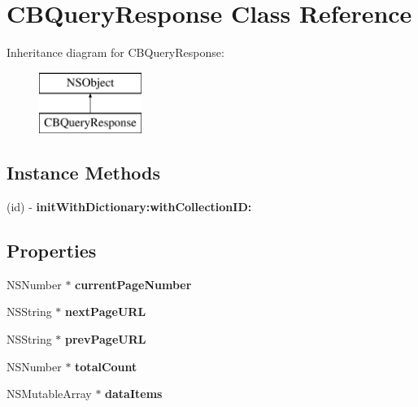 \hypertarget{interface_c_b_query_response}{\section{C\+B\+Query\+Response Class Reference}
\label{interface_c_b_query_response}
}
Inheritance diagram for C\+B\+Query\+Response\+:\begin{figure}[H]
\begin{center}
\leavevmode
\includegraphics[height=2.000000cm]{interface_c_b_query_response}
\end{center}
\end{figure}
\subsection*{Instance Methods}
\begin{DoxyCompactItemize}
\item 
\hypertarget{interface_c_b_query_response_a809ad4e5c9b92f804f0129ce1e0b9088}{(id) -\/ {\bfseries init\+With\+Dictionary\+:with\+Collection\+I\+D\+:}}\label{interface_c_b_query_response_a809ad4e5c9b92f804f0129ce1e0b9088}

\end{DoxyCompactItemize}
\subsection*{Properties}
\begin{DoxyCompactItemize}
\item 
\hypertarget{interface_c_b_query_response_aba01b6c192068322b0fa67e97156d305}{N\+S\+Number $\ast$ {\bfseries current\+Page\+Number}}\label{interface_c_b_query_response_aba01b6c192068322b0fa67e97156d305}

\item 
\hypertarget{interface_c_b_query_response_aef008d794504b80df0fc3ed352f09a87}{N\+S\+String $\ast$ {\bfseries next\+Page\+U\+R\+L}}\label{interface_c_b_query_response_aef008d794504b80df0fc3ed352f09a87}

\item 
\hypertarget{interface_c_b_query_response_af98ac11e259c7081eb542478759d1058}{N\+S\+String $\ast$ {\bfseries prev\+Page\+U\+R\+L}}\label{interface_c_b_query_response_af98ac11e259c7081eb542478759d1058}

\item 
\hypertarget{interface_c_b_query_response_a99789266e0e1a9d84d7a7369af0234db}{N\+S\+Number $\ast$ {\bfseries total\+Count}}\label{interface_c_b_query_response_a99789266e0e1a9d84d7a7369af0234db}

\item 
\hypertarget{interface_c_b_query_response_ad5974b09b5e8b03e990d39f4d8bf3e88}{N\+S\+Mutable\+Array $\ast$ {\bfseries data\+Items}}\label{interface_c_b_query_response_ad5974b09b5e8b03e990d39f4d8bf3e88}

\end{DoxyCompactItemize}


